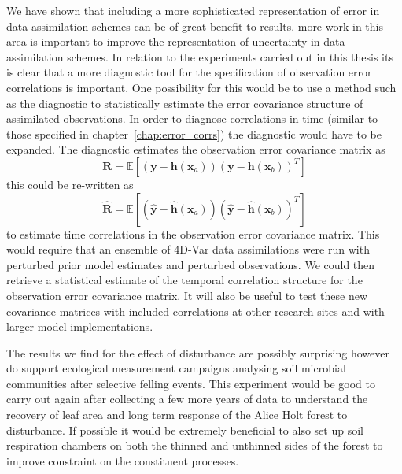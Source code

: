 We have shown that including a more sophisticated representation of error in data assimilation schemes can be of great benefit to results. more work in this area is important to improve the representation of uncertainty in data assimilation schemes. In relation to the experiments carried out in this thesis its is clear that a more diagnostic tool for the specification of observation error correlations is important. One possibility for this would be to use a method such as the \citet{desroziers2005diagnosis} diagnostic to statistically estimate the error covariance structure of assimilated observations. In order to diagnose correlations in time (similar to those specified in chapter~\ref{chap:error_corrs}) the \citet{desroziers2005diagnosis} diagnostic would have to be expanded. The \citet{desroziers2005diagnosis} diagnostic estimates the observation error covariance matrix as
\begin{equation}
\textbf{R} = \mathbb{E}[(\textbf{y}-\textbf{h}(\textbf{x}_a))(\textbf{y}-\textbf{h}(\textbf{x}_b))^{T}]
\end{equation}
this could be re-written as
\begin{equation}
\hat{\textbf{R}} = \mathbb{E}[(\hat{\textbf{y}}-\hat{\textbf{h}}(\textbf{x}_a))(\hat{\textbf{y}}-\hat{\textbf{h}}(\textbf{x}_b))^{T}]
\end{equation}
to estimate time correlations in the observation error covariance matrix. This would require that an ensemble of 4D-Var data assimilations were run with perturbed prior model estimates and perturbed observations. We could then retrieve a statistical estimate of the temporal correlation structure for the observation error covariance matrix. It will also be useful to test these new covariance matrices with included correlations at other research sites and with larger model implementations.

The results we find for the effect of disturbance are possibly surprising however do support ecological measurement campaigns analysing soil microbial communities after selective felling events. This experiment would be good to carry out again after collecting a few more years of data to understand the recovery of leaf area and long term response of the Alice Holt forest to disturbance. If possible it would be extremely beneficial to also set up soil respiration chambers on both the thinned and unthinned sides of the forest to improve constraint on the constituent processes.